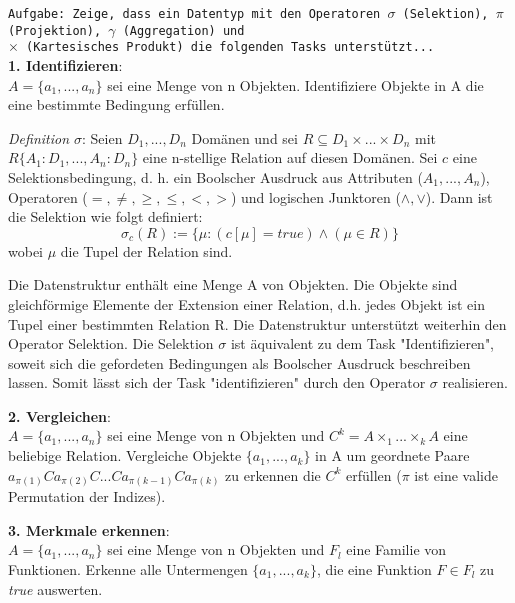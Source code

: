 \documentclass{article}		%
\begin{document}
\texttt{Aufgabe: Zeige, dass ein Datentyp mit den Operatoren $\sigma$ (Selektion), $\pi$ (Projektion), $\gamma$ (Aggregation) und \\
$\times$ (Kartesisches Produkt) die folgenden Tasks unterstützt...}\\

\textbf{1. Identifizieren}:\\
$A=\{a_1,...,a_n\}$ sei eine Menge von n Objekten. Identifiziere Objekte in A die eine bestimmte Bedingung erfüllen.\\
\smallskip

\textit{Definition $\sigma$}: Seien $D_1,...,D_n$ Domänen und sei $R \subseteq D_1 \times ... \times D_n $ mit $R \{A_1:D_1,...,A_n:D_n\}$ eine n-stellige Relation auf diesen Domänen. Sei $c$ eine Selektionsbedingung, d. h. ein Boolscher Ausdruck aus Attributen ($A_1,...,A_n$), Operatoren ($= , \neq , \geq , \leq , <, > $) und logischen Junktoren ($\wedge , \vee $). Dann ist die Selektion wie folgt definiert: 
\[ \sigma_c (R) := \{ \mu: (c \left[ \mu \right] = true) \wedge (\mu \in R)\} \] wobei $\mu$ die Tupel der Relation sind.\\
\smallskip

Die Datenstruktur enthält eine Menge A von Objekten. Die Objekte sind gleichförmige Elemente der Extension einer Relation, d.h. jedes Objekt ist ein Tupel einer bestimmten Relation R. Die Datenstruktur unterstützt weiterhin den Operator Selektion. Die Selektion $\sigma$ ist äquivalent zu dem Task "Identifizieren", soweit sich die gefordeten Bedingungen als Boolscher Ausdruck beschreiben lassen. Somit lässt sich der Task "identifizieren" durch den Operator $\sigma$ realisieren.

\bigskip

\bigskip

\textbf{2. Vergleichen}:\\
 $A=\{a_1,...,a_n\}$ sei eine Menge von n Objekten und $C^k = A \times_1 ... \times_k A$ eine beliebige Relation. Vergleiche Objekte $\{a_1,...,a_k\}$ in A um geordnete Paare $a_{\pi (1)}Ca_{\pi (2)}C...Ca_{\pi (k-1)}Ca_{\pi (k)}$ zu erkennen die $C^k$ erfüllen  ($\pi$ ist eine valide Permutation der Indizes). \\

\bigskip

\textbf{3. Merkmale erkennen}:\\
 $A=\{a_1,...,a_n\}$ sei eine Menge von n Objekten und $F_l$ eine Familie von Funktionen. Erkenne alle Untermengen $\{a_1,...,a_k\}$, die eine Funktion $F \in F_l$ zu \textit{true} auswerten.\\
\end{document}
